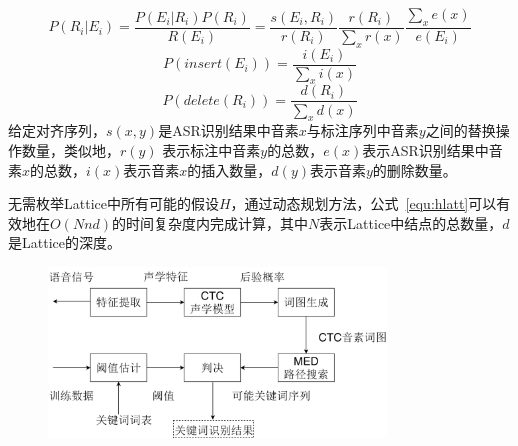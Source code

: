 \begin{equation}
P(R_{i}|E_{i}) = \frac{P(E_{i}|R_{i})P(R_{i})}{R(E_{i})}=\frac{s(E_{i},R_{i})}{r(R_{i})}\frac{r(R_{i})}{\mathop{\sum}_{x}r(x)}\frac{\mathop{\sum}_{x}e(x)}{e(E_{i})}
\end{equation}
\begin{equation}
P(insert(E_{i})) = \frac{i(E_{i})}{\mathop{\sum}_{x}i(x)}
\end{equation}
\begin{equation}
P(delete(R_{i})) = \frac{d(R_{i})}{\mathop{\sum}_{x}d(x)}
\end{equation}
给定对齐序列，$s(x,y)$是ASR识别结果中音素$x$与标注序列中音素$y$之间的替换操作数量，类似地，$r(y)$ 表示标注中音素$y$的总数，$e(x)$表示ASR识别结果中音素$x$的总数，$i(x)$表示音素$x$的插入数量，$d(y)$表示音素$y$的删除数量。

无需枚举Lattice中所有可能的假设$H$，通过动态规划方法，公式~\ref{equ:hlatt}可以有效地在$O(Nnd)$的时间复杂度内完成计算，其中$N$表示Lattice中结点的总数量，$d$是Lattice的深度。


\begin{figure}[!htp]
  \centering
    \captionstyle{\centering}
    \includegraphics[width=0.8\textwidth]{figure/kws-framework.png}
\end{figure}

